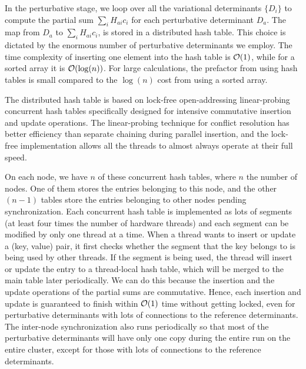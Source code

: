 \documentclass[%
reprint,
 superscriptaddress,
 amsmath,amssymb,
 aps,
]{revtex4-1}
\begin{document}
In the perturbative stage, we loop over all the variational determinants $\{D_i\}$ to compute the partial sum $\sum_i H_{ai}c_{i}$
for each perturbative determinant $D_a$.
The map from $D_a$ to $\sum_i H_{ai}c_{i}$, is stored in a distributed hash table.
This choice is dictated by the enormous number of perturbative determinants we employ.
The time complexity of inserting one element into the hash table is ${\cal O}(1)$, while for a sorted array it is ${\cal O}(\log(n))$.
For large calculations, the prefactor from using hash tables is small compared to the $\log(n)$ cost from using a sorted array.

The distributed hash table is based on lock-free open-addressing linear-probing concurrent hash tables specifically designed
for intensive commutative insertion and update operations.
The linear-probing technique for conflict resolution has better efficiency than separate chaining during parallel insertion,
and the lock-free implementation allows all the threads to almost always operate at their full speed.

On each node, we have $n$ of these concurrent hash tables, where $n$ the number of nodes.
One of them stores the entries belonging to this node, and the other $(n-1)$ tables store the entries belonging to other nodes pending synchronization.
Each concurrent hash table is implemented as lots of segments (at least four times the number of hardware threads) and each segment can be modified by only one thread at a time.
When a thread wants to insert or update a (key, value) pair, it first checks whether the segment that the key belongs to is being used by other threads.
If the segment is being used, the thread will insert or update the entry to a thread-local hash table, which will be merged to the main table later periodically.
We can do this because the insertion and the update operations of the partial sums are commutative.
Hence, each insertion and update is guaranteed to finish within ${\cal O}(1)$ time without getting locked, even for perturbative determinants with lots of connections to the reference determinants.
The inter-node synchronization also runs periodically so that most of the perturbative determinants will have only one copy during the entire run on the entire cluster, except for those with lots of connections to the reference determinants.
\end{document}
